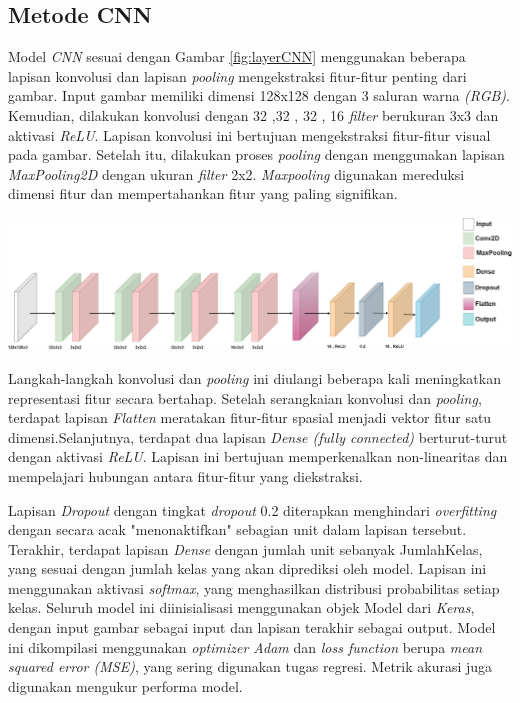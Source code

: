 \subsection{Metode CNN}
Model \textit{CNN} sesuai dengan Gambar \ref{fig:layerCNN} menggunakan beberapa lapisan konvolusi dan lapisan \textit{pooling} mengekstraksi fitur-fitur penting dari gambar. Input gambar memiliki dimensi 128x128 dengan 3 saluran warna \textit{(RGB)}. Kemudian, dilakukan konvolusi dengan 32 ,32 , 32 , 16 \textit{filter} berukuran 3x3 dan aktivasi \textit{ReLU}. Lapisan konvolusi ini bertujuan mengekstraksi fitur-fitur visual pada gambar. Setelah itu, dilakukan proses \textit{pooling} dengan menggunakan lapisan \textit{MaxPooling2D} dengan ukuran \textit{filter} 2x2. \textit{Maxpooling} digunakan mereduksi dimensi fitur dan mempertahankan fitur yang paling signifikan.
\begin{center}
	\includegraphics[width=1.0\linewidth]{gambar/bener/Arsitektur_CNN_Revisi.png}
	\label{fig:layerCNN}
\end{center}
Langkah-langkah konvolusi dan \textit{pooling} ini diulangi beberapa kali meningkatkan representasi fitur secara bertahap. Setelah serangkaian konvolusi dan \textit{pooling}, terdapat lapisan \textit{Flatten} meratakan fitur-fitur spasial menjadi vektor fitur satu dimensi.Selanjutnya, terdapat dua lapisan \textit{{Dense} (fully connected)} berturut-turut dengan aktivasi \textit{ReLU}. Lapisan ini bertujuan memperkenalkan non-linearitas dan mempelajari hubungan antara fitur-fitur yang diekstraksi.

Lapisan \textit{Dropout} dengan tingkat \textit{dropout} 0.2 diterapkan menghindari \textit{overfitting} dengan secara acak "menonaktifkan" sebagian unit dalam lapisan tersebut. Terakhir, terdapat lapisan {\textit{Dense}} dengan jumlah unit sebanyak JumlahKelas, yang sesuai dengan jumlah kelas yang akan diprediksi oleh model. Lapisan ini menggunakan aktivasi \textit{softmax}, yang menghasilkan distribusi probabilitas setiap kelas. Seluruh model ini diinisialisasi menggunakan objek Model dari \textit{Keras}, dengan input gambar sebagai input dan lapisan terakhir sebagai output. Model ini dikompilasi menggunakan \textit{optimizer Adam} dan \textit{loss function} berupa \textit{mean squared error (MSE)}, yang sering digunakan tugas regresi. Metrik akurasi juga digunakan mengukur performa model.

